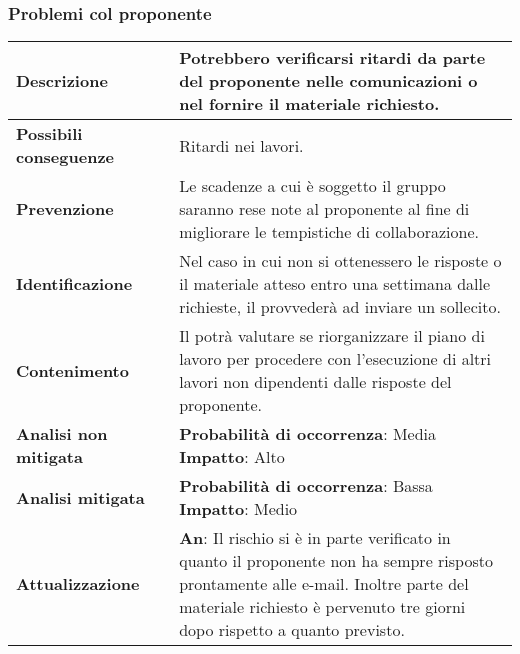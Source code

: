 	\newpage
	\subsubsection {Problemi col proponente}
	\label{subsec:pbmProponente}
	
	
	\small
	\begin{table}[H]
		\begin{center}			
			\begin{tabular}{p{2.5cm}p{0.5cm}p{11cm}}
				\arrayrulecolor{lightgray}
				
				\toprule				
				\textbf{Descrizione}
				& &
				Potrebbero verificarsi ritardi da parte del proponente nelle comunicazioni o nel fornire il materiale richiesto.
				\\
				\midrule
				\textbf{Possibili \newline conseguenze}
				& &
				Ritardi nei lavori.
				\\
				\midrule
				\textbf{Prevenzione}
				& &
				Le scadenze a cui è soggetto il gruppo saranno rese note al proponente al fine di migliorare le tempistiche di collaborazione.
				\\
				\midrule
				\textbf{Identificazione}
				& &
				Nel caso in cui non si ottenessero le risposte o il materiale atteso entro una settimana dalle richieste, il \responsabilediprogetto{} provvederà ad inviare un sollecito.
				\\
				\midrule
				\textbf{Contenimento}
				& &
				Il \responsabilediprogetto{} potrà valutare se riorganizzare il piano di lavoro per procedere con l'esecuzione di altri lavori non dipendenti dalle risposte del proponente.
				\\
				\midrule
				\textbf{Analisi \newline non mitigata}
				& &
				\textbf{Probabilità di occorrenza}: Media
				\newline
				\textbf{Impatto}: Alto
				\\
				\midrule
				\textbf{Analisi \newline mitigata}
				& &
				\textbf{Probabilità di occorrenza}: Bassa
				\newline
				\textbf{Impatto}: Medio
				\\
				\midrule
				\textbf{Attualizzazione}
				& &
				\textbf{An}: Il rischio si è in parte verificato in quanto il proponente non ha sempre risposto prontamente alle e-mail. Inoltre parte del materiale richiesto è pervenuto tre giorni dopo rispetto a quanto previsto.
				\newline

\end{tabular}
\end{center}
\end{table}
